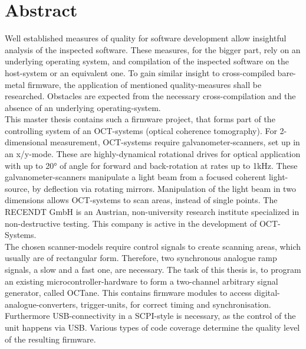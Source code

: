 \chapter{Abstract}


Well established measures of quality for software development allow insightful analysis of the inspected software. These measures, for the bigger part, rely on an underlying operating system, and compilation of the inspected software on the host-system or an equivalent one. To gain similar insight to cross-compiled bare-metal firmware, the application of mentioned quality-measures shall be researched. Obstacles are expected from the necessary cross-compilation and the absence of an underlying operating-system. \\

This master thesis contains such a firmware project, that forms part of the controlling system of an OCT-systems (optical coherence tomography). For 2-dimensional measurement, OCT-systems require galvanometer-scanners, set up in an x/y-mode. These are highly-dynamical rotational drives for optical application with up to 20° of angle for forward and back-rotation at rates up to 1kHz. These galvanometer-scanners manipulate a light beam from a focused coherent light-source, by deflection via rotating mirrors. Manipulation of the light beam in two dimensions allows OCT-systems to scan areas, instead of single points. The RECENDT GmbH is an Austrian, non-university research institute specialized in non-destructive testing. This company is active in the development of OCT-Systems. \\

The chosen scanner-models require control signals to create scanning areas, which usually are of rectangular form. Therefore, two synchronous analogue ramp signals, a slow and a fast one, are necessary. The task of this thesis is, to program an existing microcontroller-hardware to form a two-channel arbitrary signal generator, called OCTane. This contains firmware modules to access digital-analogue-converters, trigger-units, for correct timing and synchronisation. Furthermore USB-connectivity in a SCPI-style is necessary, as the control of the unit happens via USB. Various types of code coverage determine the quality level of the resulting firmware. \\


